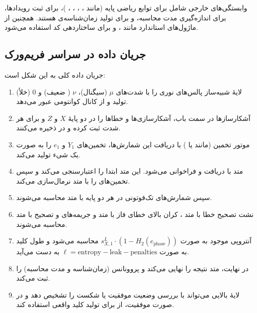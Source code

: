 وابستگی‌های خارجی شامل  برای توابع ریاضی پایه (مانند ، ، ، ، )،  برای ثبت رویدادها،  برای اندازه‌گیری مدت محاسبه، و  برای تولید زمان‌شناسه‌ی  هستند. همچنین از ماژول‌های استاندارد  مانند ،  و  برای ساختاردهی کد استفاده می‌شود.

\subsection{جریان داده در سراسر فریم‌ورک}

جریان داده کلی به این شکل است:
\begin{enumerate}
	\item لایۀ شبیه‌ساز پالس‌های نوری را با شدت‌های $\mu$ (سیگنال)، $\nu$ ( ضعیف) و 0 (خلأ) تولید و از کانال کوانتومی عبور می‌دهد.
	\item آشکارسازها در سمت باب، آشکارسازی‌ها و خطاها را در دو پایۀ $X$ و $Z$ و برای هر شدت ثبت کرده و در  ذخیره می‌کنند.
	\item موتور تخمین  (مانند  یا ) با دریافت این شمارش‌ها، تخمین‌های $Y_1$ و $e_1$ را به صورت یک شیء  تولید می‌کند.
	\item متد  با دریافت  و  فراخوانی می‌شود. این متد ابتدا  را اعتبارسنجی می‌کند و سپس تخمین‌های  را با متد  نرمال‌سازی می‌کند.
	\item سپس شمارش‌های تک‌فوتونی در هر دو پایه با متد  محاسبه می‌شوند.
	\item نشت تصحیح خطا با متد ، کران بالای خطای فاز با متد  و جریمه‌های  و تصحیح با متد  محاسبه می‌شوند.
	\item آنتروپی موجود به صورت $s_{X,1}^L \cdot (1 - H_2(e_{\text{phase}}))$ محاسبه می‌شود و طول کلید به صورت $\ell = \text{entropy} - \text{leak} - \text{penalties}$ به دست می‌آید.
	\item در نهایت، متد  نتیجه را نهایی می‌کند و پروونانس (زمان‌شناسه و مدت محاسبه) را ثبت می‌کند.
	\item لایۀ بالایی می‌تواند با بررسی  وضعیت موفقیت یا شکست را تشخیص دهد و در صورت موفقیت، از  برای تولید کلید واقعی استفاده کند.
\end{enumerate}

